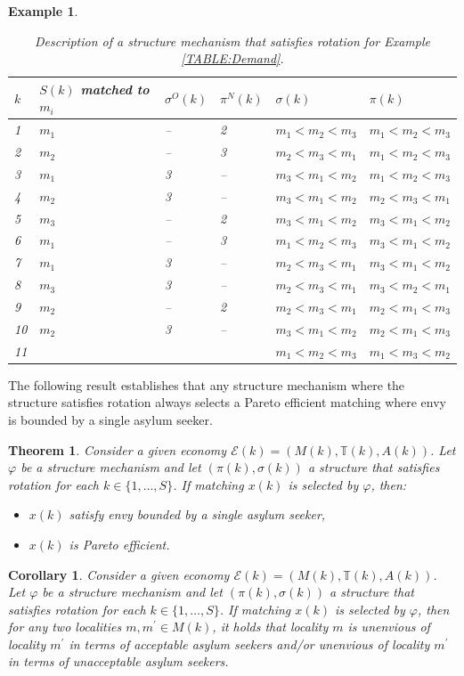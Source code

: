 \documentclass[12pt,fleqn]{article}
\newtheorem{theorem}{Theorem}
\newtheorem{corollary}{Corollary}
\newtheorem{example}{Example}
\begin{document}
\begin{example}
\begin{table}[h!]
\caption{Description of a structure mechanism that satisfies rotation for Example \ref{TABLE:Demand}.}\label{TABLE:Mechanism}
\begin{tabular}{llllll}\hline
$k$ & $S(k)$ matched to $m_i$ & $\sigma^O(k)$ & $\pi^N(k)$ & $\sigma(k)$ & $\pi(k)$ \\ \hline
1   & $m_1$ & -- & 2 & $m_1<m_2<m_3$ & $m_1<m_2<m_3$ \\
2   & $m_2$ & -- & 3 & $m_2<m_3<m_1$ & $m_1<m_2<m_3$ \\
3   & $m_1$ & 3 & -- & $m_3<m_1<m_2$ & $m_1<m_2<m_3$ \\
4   & $m_2$ & 3 & -- & $m_3<m_1<m_2$ & $m_2<m_3<m_1$ \\
5   & $m_3$ & -- & 2 & $m_3<m_1<m_2$ & $m_3<m_1<m_2$ \\
6   & $m_1$ & -- & 3 & $m_1<m_2<m_3$ & $m_3<m_1<m_2$ \\
7   & $m_1$ & 3 & -- & $m_2<m_3<m_1$ & $m_3<m_1<m_2$ \\
8   & $m_3$ & 3 & -- & $m_2<m_3<m_1$ & $m_3<m_2<m_1$ \\
9   & $m_2$ & -- & 2 & $m_2<m_3<m_1$ & $m_2<m_1<m_3$ \\
10  & $m_2$ & 3 & -- & $m_3<m_1<m_2$ & $m_2<m_1<m_3$ \\
11  &       &   &    & $m_1<m_2<m_3$ & $m_1<m_3<m_2$ \\ \hline
\end{tabular}
\end{table}
\end{example}

\noindent The following result establishes that any structure mechanism where the structure satisfies rotation always selects a Pareto efficient matching where envy is bounded by a single asylum seeker.

\begin{theorem}\rm\label{THEOREM:envy_efficiency}
Consider a given economy $\mathcal{E}(k)=(M(k),\mathbb{T}(k),A(k))$. Let $\varphi$ be a structure mechanism and let $(\pi(k),\sigma(k))$ a structure that satisfies rotation for each $k\in \{1,\ldots,S\}$. If matching $x(k)$ is selected by $\varphi$, then:
\begin{itemize}
\item[(i)] $x(k)$ satisfy envy bounded by a single asylum seeker,
\item[(ii)] $x(k)$ is Pareto efficient.
\end{itemize}
\end{theorem}
\begin{corollary}\rm\label{COROLLARY:envy}
Consider a given economy $\mathcal{E}(k)=(M(k),\mathbb{T}(k),A(k))$. Let $\varphi$ be a structure mechanism and let $(\pi(k),\sigma(k))$ a structure that satisfies rotation for each $k\in \{1,\ldots,S\}$. If matching $x(k)$ is selected by $\varphi$, then for any two localities $m,m^\prime\in M(k)$, it holds that locality $m$ is unenvious of locality $m^\prime$ in terms of acceptable asylum seekers and/or unenvious of locality $m^\prime$ in terms of unacceptable asylum seekers.
\end{corollary}
\end{document}
